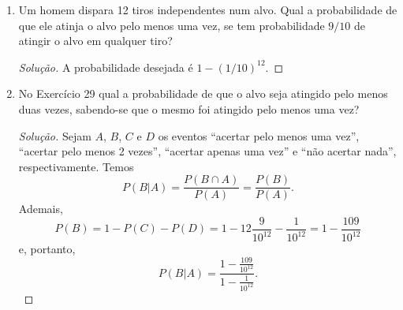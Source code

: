 \documentclass[../Notas.tex]{subfiles}
\begin{document}
\begin{enumerate}
\begin{proof}[Solução]
\[                     = P(C|B).
        \]
        Daí, segue que
        \[
        P(A|B\cap C) = \frac{P(A\cap B\cap C}{P(B\cap C)}
                     = \frac{P(A\cap B)P(B\cap C)}{P(B\cap C)P(B)}
                     = P(A|B).
        \]
    \end{proof}
    \item Um homem dispara 12 tiros independentes num alvo. Qual a probabilidade de que ele atinja o alvo pelo menos uma vez, se tem probabilidade $9/10$ de atingir o alvo em qualquer tiro?
    \begin{proof}[Solução]
        A probabilidade desejada é $1 - (1/10)^{12}$.
    \end{proof}
    \item No Exercício 29 qual a probabilidade de que o alvo seja atingido pelo menos duas vezes, sabendo-se que o mesmo foi atingido pelo menos uma vez?
    \begin{proof}[Solução]
        Sejam $A$, $B$, $C$ e $D$ os eventos ``acertar pelo menos uma vez'', ``acertar pelo
        menos 2 vezes'', ``acertar apenas uma vez'' e ``não acertar nada'', respectivamente.
        Temos
        \[
        P(B|A) = \frac{P(B\cap A)}{P(A)} = \frac{P(B)}{P(A)}.
        \]
        Ademais,
        \[
        P(B) = 1 - P(C) - P(D)
             = 1 - 12\frac{9}{10^{12}} - \frac{1}{10^{12}}
             = 1 - \frac{109}{10^{12}}
        \]
        e, portanto,
        \[
        P(B|A) = \frac{1 - \frac{109}{10^{12}}}{1 - \frac{1}{10^{12}}}.
        \]
    \end{proof}
    \end{enumerate}
\end{document}

